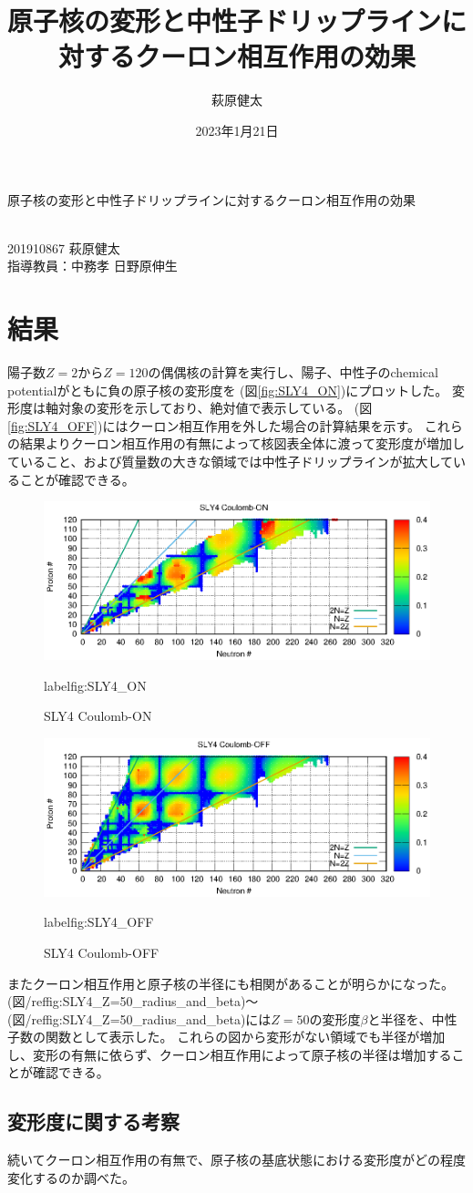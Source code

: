 \documentclass[12pt]{jarticle}
\title{原子核の変形と中性子ドリップラインに対するクーロン相互作用の効果}
\author{萩原健太}
\date{2023年1月21日}
\begin{document}
\begin{center}
    {\Large
        原子核の変形と中性子ドリップラインに対するクーロン相互作用の効果
    }
\end{center}

\begin{flushright}
  \\201910867 萩原健太\\
  指導教員：中務孝 日野原伸生
\end{flushright}

\section{結果}
陽子数$Z=2$から$Z=120$の偶偶核の計算を実行し、陽子、中性子のchemical potentialがともに負の原子核の変形度を (図\ref{fig:SLY4_ON})にプロットした。
変形度は軸対象の変形を示しており、絶対値で表示している。
(図\ref{fig:SLY4_OFF})にはクーロン相互作用を外した場合の計算結果を示す。
これらの結果よりクーロン相互作用の有無によって核図表全体に渡って変形度が増加していること、および質量数の大きな領域では中性子ドリップラインが拡大していることが確認できる。
\begin{figure}[ht]
    \centering
    \includegraphics{SLY4_ON.eps}
    \setlength\floatsep{0pt}
    \setlength\intextsep{0pt} 
    \setlength\textfloatsep{0pt}
    \caption{SLY4 Coulomb-ON}
    label{fig:SLY4_ON}
\end{figure}
\begin{figure}[ht]
    \centering
    \includegraphics{SLY4_OFF.eps}
    \setlength\floatsep{0pt}
    \caption{SLY4 Coulomb-OFF}
    label{fig:SLY4_OFF}
\end{figure}

またクーロン相互作用と原子核の半径にも相関があることが明らかになった。
(図/ref{fig:SLY4_Z=50_radius_and_beta})～ (図/ref{fig:SLY4_Z=50_radius_and_beta})には$Z=50$の変形度$\beta$と半径を、中性子数の関数として表示した。
これらの図から変形がない領域でも半径が増加し、変形の有無に依らず、クーロン相互作用によって原子核の半径は増加することが確認できる。

\subsection{変形度に関する考察}
続いてクーロン相互作用の有無で、原子核の基底状態における変形度がどの程度変化するのか調べた。
\end{document}
